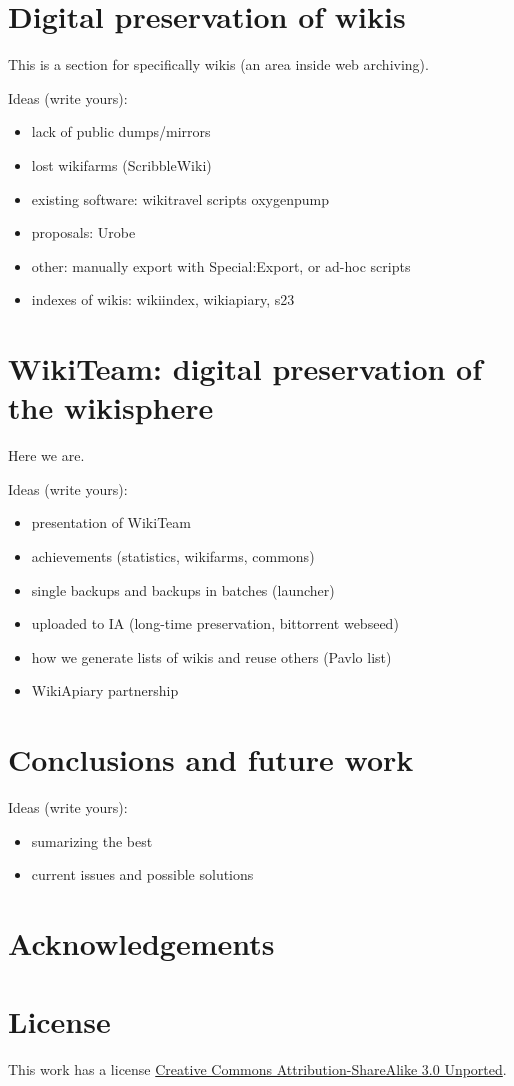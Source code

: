 \documentclass[11pt,twocolumn]{article}
\begin{document}
\section{Digital preservation of wikis}

This is a section for specifically wikis (an area inside web archiving).

Ideas (write yours):
\begin{itemize}
\item lack of public dumps/mirrors
\item lost wikifarms (ScribbleWiki)
\item existing software: wikitravel scripts oxygenpump %
\item proposals: Urobe
\item other: manually export with Special:Export, or ad-hoc scripts
\item indexes of wikis: wikiindex, wikiapiary, s23
\end{itemize}



\section{WikiTeam: digital preservation of the wikisphere}

Here we are.

Ideas (write yours):
\begin{itemize}
\item presentation of WikiTeam
\item achievements (statistics, wikifarms, commons)
\item single backups and backups in batches (launcher)
\item uploaded to IA (long-time preservation, bittorrent webseed)
\item how we generate lists of wikis and reuse others (Pavlo list)
\item WikiApiary partnership
\end{itemize}


\section{Conclusions and future work}

Ideas (write yours):
\begin{itemize}
\item sumarizing the best 
\item current issues and possible solutions
\end{itemize}


        


\section*{Acknowledgements}


\section*{License}
This work has a license \href{http://creativecommons.org/licenses/by-sa/3.0/}{Creative Commons Attribution-ShareAlike 3.0 Unported}.
\end{document}
